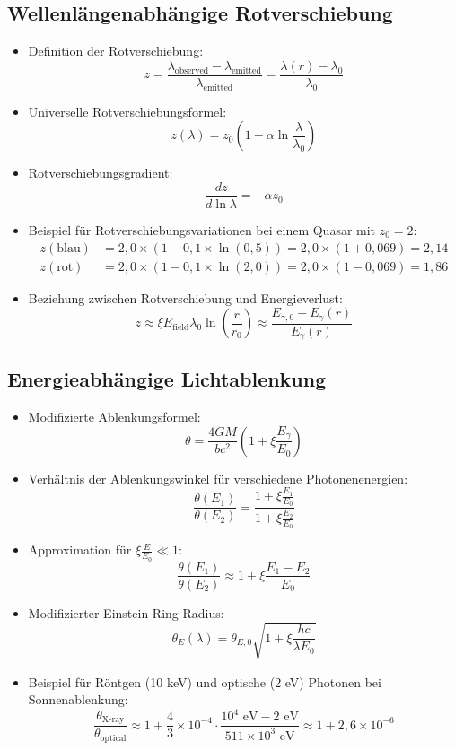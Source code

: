 \documentclass[12pt,a4paper]{article}
\begin{document}
	\subsection{Wellenl\"{a}ngenabh\"{a}ngige Rotverschiebung}
\begin{itemize}
	\item Definition der Rotverschiebung:
	$$z = \frac{\lambda_{\text{observed}} - \lambda_{\text{emitted}}}{\lambda_{\text{emitted}}} = \frac{\lambda(r) - \lambda_0}{\lambda_0}$$
	
	\item Universelle Rotverschiebungsformel:
	$$\boxed{z(\lambda) = z_0\left(1 - \alpha \ln\frac{\lambda}{\lambda_0}\right)}$$
	
	\item Rotverschiebungsgradient:
	$$\frac{dz}{d\ln\lambda} = -\alpha z_0$$
	
	\item Beispiel f\"{u}r Rotverschiebungsvariationen bei einem Quasar mit $z_0 = 2$:
	\begin{align*}
		z(\text{blau}) &= 2,0 \times (1 - 0,1 \times \ln(0,5)) = 2,0 \times (1 + 0,069) = 2,14\\
		z(\text{rot}) &= 2,0 \times (1 - 0,1 \times \ln(2,0)) = 2,0 \times (1 - 0,069) = 1,86
	\end{align*}
	
	\item Beziehung zwischen Rotverschiebung und Energieverlust:
	$$z \approx \xi E_{\text{field}} \lambda_0 \ln\left(\frac{r}{r_0}\right) \approx \frac{E_{\gamma,0} - E_\gamma(r)}{E_\gamma(r)}$$
\end{itemize}

	\subsection{Energieabh\"{a}ngige Lichtablenkung}
	\begin{itemize}
		\item Modifizierte Ablenkungsformel:
		$$\boxed{\theta = \frac{4GM}{bc^2}\left(1 + \xi \frac{E_\gamma}{E_0}\right)}$$
		
		\item Verh\"{a}ltnis der Ablenkungswinkel f\"{u}r verschiedene Photonenenergien:
		$$\frac{\theta(E_1)}{\theta(E_2)} = \frac{1 + \xi \frac{E_1}{E_0}}{1 + \xi \frac{E_2}{E_0}}$$
		
		\item Approximation f\"{u}r $\xi \frac{E}{E_0} \ll 1$:
		$$\frac{\theta(E_1)}{\theta(E_2)} \approx 1 + \xi \frac{E_1 - E_2}{E_0}$$
		
		\item Modifizierter Einstein-Ring-Radius:
		$$\theta_E(\lambda) = \theta_{E,0} \sqrt{1 + \xi \frac{hc}{\lambda E_0}}$$
		
		\item Beispiel f\"{u}r R\"{o}ntgen (10 keV) und optische (2 eV) Photonen bei Sonnenablenkung:
		$$\frac{\theta_{\text{X-ray}}}{\theta_{\text{optical}}} \approx 1 + \frac{4}{3} \times 10^{-4} \cdot \frac{10^4 \text{ eV} - 2 \text{ eV}}{511 \times 10^3 \text{ eV}} \approx 1 + 2,6 \times 10^{-6}$$
	\end{itemize}
	
\end{document}
